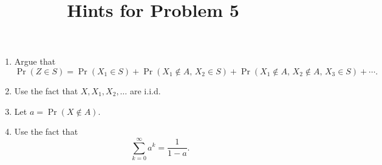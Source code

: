 \documentclass[12pt]{article}
\title{Hints for Problem 5}
\author{}
\date{}
\begin{document}
\maketitle

\begin{enumerate}
    \item Argue that 
        $$\Pr(Z\in S) = \Pr(X_1\in S) + \Pr(X_1\not\in A,\,X_2\in S) + \Pr(X_1\not\in A,\,X_2\not\in A,\,X_3\in S) + \cdots.$$
    \item Use the fact that $X,X_1,X_2,\ldots$ are i.i.d.
    \item Let $a = \Pr(X\not\in A)$.
    \item Use the fact that 
        $$\sum_{k=0}^\infty a^k = \frac{1}{1-a}.$$
\end{enumerate}
\end{document}
